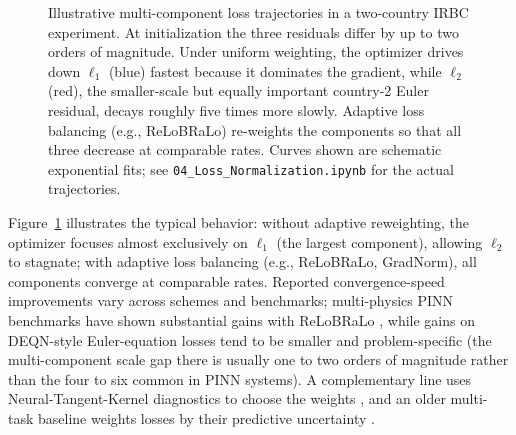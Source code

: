 \documentclass[11pt,a4paper]{report}
\begin{document}
\begin{figure}[ht]
\centering
{}
\caption{Illustrative multi-component loss trajectories in a two-country IRBC experiment.  At initialization the three residuals differ by up to two orders of magnitude.  Under uniform weighting, the optimizer drives down $\ell_1$ (blue) fastest because it dominates the gradient, while $\ell_2$ (red), the smaller-scale but equally important country-2 Euler residual, decays roughly five times more slowly.  Adaptive loss balancing (e.g., ReLoBRaLo) re-weights the components so that all three decrease at comparable rates.  Curves shown are schematic exponential fits; see \texttt{04\_Loss\_Normalization.ipynb} for the actual trajectories.}
\label{fig:multi_component_loss}
\end{figure}

Figure~\ref{fig:multi_component_loss} illustrates the typical behavior: without adaptive reweighting, the optimizer focuses almost exclusively on $\ell_1$ (the largest component), allowing $\ell_2$ to stagnate; with adaptive loss balancing (e.g., ReLoBRaLo, GradNorm), all components converge at comparable rates.  Reported convergence-speed improvements vary across schemes and benchmarks; multi-physics PINN benchmarks have shown substantial gains with ReLoBRaLo \citep{bischof2025relobralo}, while gains on DEQN-style Euler-equation losses tend to be smaller and problem-specific (the multi-component scale gap there is usually one to two orders of magnitude rather than the four to six common in PINN systems).  A complementary line uses Neural-Tangent-Kernel diagnostics to choose the weights \citep{wang2022when}, and an older multi-task baseline weights losses by their predictive uncertainty \citep{kendall2018multi}.
\end{document}
